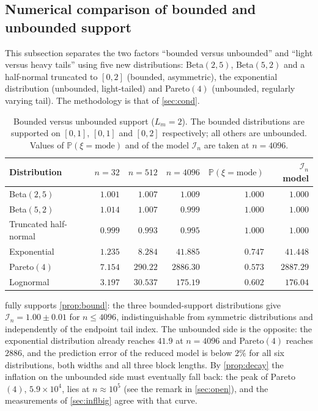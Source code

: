 \documentclass[twocolumn,review,hidelinks,oneeqnum,onetabnum,onefignum,onethmnum]{siamart251216}
\begin{document}
\subsection{Numerical comparison of bounded and unbounded support}
\label{sec:domains-res}

This subsection separates the two factors ``bounded versus unbounded'' and
``light versus heavy tails'' using five new distributions: Beta$(2,5)$,
Beta$(5,2)$ and a half-normal truncated to $[0,2]$ (bounded, asymmetric), the
exponential distribution (unbounded, light-tailed) and Pareto$(4)$ (unbounded,
regularly varying tail). The methodology is that of \cref{sec:cond}.

\begin{table}[!tb]
\centering
\caption{Bounded versus unbounded support ($L_m=2$). The bounded
distributions are supported on $[0,1]$, $[0,1]$ and $[0,2]$ respectively; all
others are unbounded. Values of $\mathbb{P}(\xi=\text{mode})$ and of the model
$\mathcal I_n$ are taken at $n=4096$.}
\label{tab:bounded}
\footnotesize
\setlength{\tabcolsep}{4pt}
\begin{tabular}{@{}lrrrrr@{}}
\toprule
Distribution & $n=32$ & $n=512$ & $n=4096$ & $\mathbb{P}(\xi{=}\text{mode})$ & $\mathcal I_n$ model \\
\midrule
Beta$(2,5)$      & $1.001$ & $1.007$ & $1.009$ & $1.000$ & $1.000$ \\
Beta$(5,2)$      & $1.014$ & $1.007$ & $0.999$ & $1.000$ & $1.000$ \\
Truncated half-normal & $0.999$ & $0.993$ & $0.995$ & $1.000$ & $1.000$ \\
\midrule
Exponential      & $1.235$ & $8.284$ & $41.885$ & $0.747$ & $41.448$ \\
Pareto$(4)$      & $7.154$ & $290.22$ & $2886.30$ & $0.573$ & $2887.29$ \\
Lognormal        & $3.197$ & $30.537$ & $175.19$ & $0.602$ & $176.04$ \\
\bottomrule
\end{tabular}
\end{table}

 fully supports \cref{prop:bound}: the three bounded-support
distributions give $\mathcal I_n=1.00\pm0.01$ for $n\le4096$, indistinguishable
from symmetric distributions and independently of the endpoint tail index. The
unbounded side is the opposite: the exponential distribution already reaches
$41.9$ at $n=4096$ and Pareto$(4)$ reaches $2886$, and the prediction error of the
reduced model is below $2\%$ for all six distributions, both widths and all three
block lengths. By \cref{prop:decay} the inflation on the unbounded side must
eventually fall back: the peak of Pareto$(4)$, $5.9\times10^4$, lies at
$n\approx10^5$ (see the remark in \cref{sec:open}), and the measurements of
\cref{sec:inflbig} agree with that curve.
\end{document}
